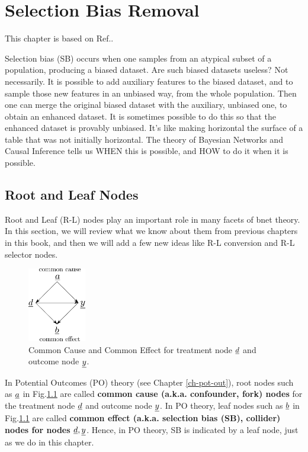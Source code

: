 \chapter{Selection Bias Removal}
\label{ch-sb-removal}
This chapter
is based on Ref.\cite{bare-sb-removal}.

Selection bias (SB)
occurs when one
samples from an
atypical subset
of a
population,
producing a biased dataset.
Are such biased
datasets
useless? Not necessarily.
It is possible to
add auxiliary features
to the biased dataset, and to
sample those new features
in an unbiased way,
 from the whole population.
Then
one can merge
the original
 biased dataset with the
auxiliary, unbiased one,
to obtain an enhanced dataset.
It is sometimes
possible to do this so that the enhanced
dataset is provably
unbiased.
It's like making horizontal
the surface of a table
 that was
 not initially
horizontal.
The theory of Bayesian Networks and Causal
Inference tells us
WHEN this is possible,
and HOW to do it
when it is possible.


\section{Root and Leaf Nodes}

Root and Leaf (R-L) nodes play an important role in many facets of
bnet theory. In this section, we will review what we know
about them from previous chapters in this book, and then we will add a few new
ideas like R-L conversion and R-L selector nodes.


\begin{figure}[h!]
\centering
\includegraphics[width=1in]
{sb-removal/common-cause-effect.png}
\caption{Common Cause
and Common Effect for
treatment node $\rvd$
and outcome node $\rvy$.}
\label{fig-common-cause-effect}
\end{figure}

In Potential
Outcomes (PO) theory
 (see Chapter \ref{ch-pot-out}),
root nodes such
as $\rva$ in
Fig.\ref{fig-common-cause-effect}
are called {\bf common cause
 (a.k.a. confounder, fork) nodes}
for the treatment node $\rvd$
and outcome node $\rvy$.
In PO theory, leaf nodes such as
$\rvb$ in
Fig.\ref{fig-common-cause-effect} are
called
{\bf common effect
(a.k.a. selection bias (SB), collider) nodes
for nodes $\rvd, \rvy$}.
Hence, in PO theory,
SB is indicated
by
a leaf node,
just as we do in this chapter.

